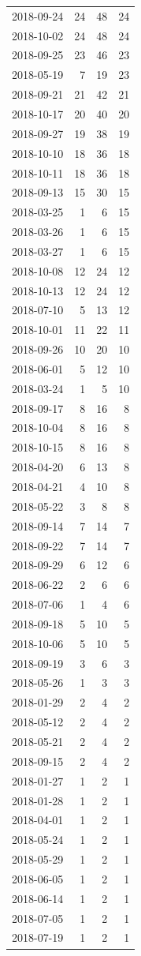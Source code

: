 \begin{tabular}{lrrr}
2018-09-24 & 24 & 48 & 24 \\
2018-10-02 & 24 & 48 & 24 \\
2018-09-25 & 23 & 46 & 23 \\
2018-05-19 & 7 & 19 & 23 \\
2018-09-21 & 21 & 42 & 21 \\
2018-10-17 & 20 & 40 & 20 \\
2018-09-27 & 19 & 38 & 19 \\
2018-10-10 & 18 & 36 & 18 \\
2018-10-11 & 18 & 36 & 18 \\
2018-09-13 & 15 & 30 & 15 \\
2018-03-25 & 1 & 6 & 15 \\
2018-03-26 & 1 & 6 & 15 \\
2018-03-27 & 1 & 6 & 15 \\
2018-10-08 & 12 & 24 & 12 \\
2018-10-13 & 12 & 24 & 12 \\
2018-07-10 & 5 & 13 & 12 \\
2018-10-01 & 11 & 22 & 11 \\
2018-09-26 & 10 & 20 & 10 \\
2018-06-01 & 5 & 12 & 10 \\
2018-03-24 & 1 & 5 & 10 \\
2018-09-17 & 8 & 16 & 8 \\
2018-10-04 & 8 & 16 & 8 \\
2018-10-15 & 8 & 16 & 8 \\
2018-04-20 & 6 & 13 & 8 \\
2018-04-21 & 4 & 10 & 8 \\
2018-05-22 & 3 & 8 & 8 \\
2018-09-14 & 7 & 14 & 7 \\
2018-09-22 & 7 & 14 & 7 \\
2018-09-29 & 6 & 12 & 6 \\
2018-06-22 & 2 & 6 & 6 \\
2018-07-06 & 1 & 4 & 6 \\
2018-09-18 & 5 & 10 & 5 \\
2018-10-06 & 5 & 10 & 5 \\
2018-09-19 & 3 & 6 & 3 \\
2018-05-26 & 1 & 3 & 3 \\
2018-01-29 & 2 & 4 & 2 \\
2018-05-12 & 2 & 4 & 2 \\
2018-05-21 & 2 & 4 & 2 \\
2018-09-15 & 2 & 4 & 2 \\
2018-01-27 & 1 & 2 & 1 \\
2018-01-28 & 1 & 2 & 1 \\
2018-04-01 & 1 & 2 & 1 \\
2018-05-24 & 1 & 2 & 1 \\
2018-05-29 & 1 & 2 & 1 \\
2018-06-05 & 1 & 2 & 1 \\
2018-06-14 & 1 & 2 & 1 \\
2018-07-05 & 1 & 2 & 1 \\
2018-07-19 & 1 & 2 & 1 \\
\bottomrule
\end{tabular}
